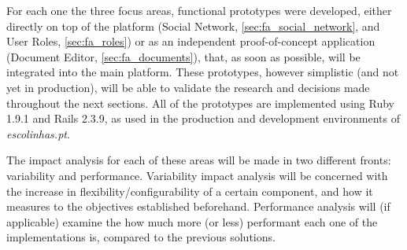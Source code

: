 For each one the three focus areas, functional prototypes were developed, either directly on top of the platform (Social Network, \ref{sec:fa_social_network}, and User Roles, \ref{sec:fa_roles}) or as an independent proof-of-concept application (Document Editor, \ref{sec:fa_documents}), that, as soon as possible, will be integrated into the main platform. These prototypes, however simplistic (and not yet in production), will be able to validate the research and decisions made throughout the next sections. All of the prototypes are implemented using Ruby 1.9.1 and Rails 2.3.9, as used in the production and development environments of \emph{escolinhas.pt}.

The impact analysis for each of these areas will be made in two different fronts: variability and performance. Variability impact analysis will be concerned with the increase in flexibility/configurability of a certain component, and how it measures to the objectives established beforehand. Performance analysis will (if applicable) examine the how much more (or less) performant each one of the implementations is, compared to the previous solutions.
